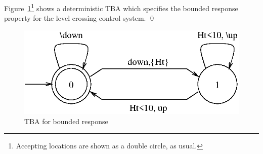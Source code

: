 {\begin{exampleb}
Figure~\ref{fig:tgcresponsetba}\footnote{Accepting locations are
shown as a double circle, as usual.} shows a deterministic TBA which
specifies the bounded response property for the level crossing control
system.
\qed
\end{exampleb}

\begin{figure}
\begin{center}
\includegraphics[width=.6\linewidth]{METHODS/tgcresponsetba.eps}
\end{center}
\caption{TBA for bounded response\label{fig:tgcresponsetba}}
\end{figure}
  
}
